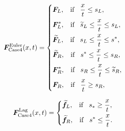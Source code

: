 \documentclass{article}
\numberwithin{equation}{section}
\numberwithin{table}{section}
\begin{document}
 \begin{equation}\label{eq:HLLCEP}
   \bm{F}^{\text{Euler}}_{\text{Case4}}(x,t) = \left\{ \begin{aligned}
		& \bm{F}_L, \hspace{0.3cm} \text{if} \hspace{0.3cm} \frac{x}{t}\le s_L, \\
		& \bm{F}_L^*, \hspace{0.3cm} \text{if} \hspace{0.3cm} \widetilde{s}_L\le \frac{x}{t} \le s_L, \\
		& \widetilde{\bm{F}}_L, \hspace{0.3cm} \text{if} \hspace{0.3cm} s_L\le \frac{x}{t} \le s^*, \\
		& \widetilde{\bm{F}}_R, \hspace{0.3cm} \text{if} \hspace{0.3cm} s^*\le \frac{x}{t} \le s_R, \\
		& \bm{F}_R^*, \hspace{0.3cm} \text{if} \hspace{0.3cm} s_R\le \frac{x}{t} \le\widetilde{ s}_R,\\
		& \bm{F}_R, \hspace{0.3cm} \text{if} \hspace{0.3cm} \frac{x}{t}\ge s_R, \\
	  \end{aligned}
	\right.
  \end{equation}

\begin{equation}
\bm{F}^{\text{Lag}}_{\text{Case4}}(x,t) = \left\{ \begin{aligned}
		& \widetilde{\bm{f}}_L, \hspace{0.3cm} \text{if} \hspace{0.3cm} s_*\ge \frac{x}{t},\\
		& \widetilde{\bm{f}}_R, \hspace{0.3cm} \text{if} \hspace{0.3cm} s^*\le \frac{x}{t}.\\
	  \end{aligned}
	\right.
  \end{equation}
\end{document}
